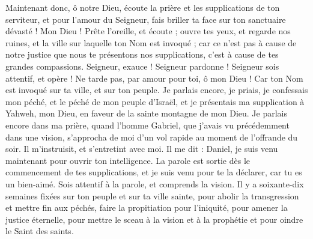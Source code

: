 \begin{multicols}{2}
Maintenant donc, ô notre Dieu, écoute la prière et les supplications de ton serviteur, et pour l'amour du Seigneur, fais briller ta face sur ton sanctuaire dévasté !
Mon Dieu ! Prête l'oreille, et écoute ; ouvre tes yeux, et regarde nos ruines, et la ville sur laquelle ton Nom est invoqué ; car ce n'est pas à cause de notre justice que nous te présentons nos supplications, c'est à cause de tes grandes compassions.
Seigneur, exauce ! Seigneur pardonne ! Seigneur sois attentif, et opère ! Ne tarde pas, par amour pour toi, ô mon Dieu ! Car ton Nom est invoqué sur ta ville, et sur ton peuple.
Je parlais encore, je priais, je confessais mon péché, et le péché de mon peuple d'Israël, et je présentais ma supplication à Yahweh, mon Dieu, en faveur de la sainte montagne de mon Dieu.
Je parlais encore dans ma prière, quand l'homme Gabriel, que j'avais vu précédemment dans une vision, s'approcha de moi d'un vol rapide au moment de l'offrande du soir.
Il m'instruisit, et s'entretint avec moi. Il me dit : Daniel, je suis venu maintenant pour ouvrir ton intelligence.
La parole est sortie dès le commencement de tes supplications, et je suis venu pour te la déclarer, car tu es un bien-aimé. Sois attentif à la parole, et comprends la vision.
Il y a soixante-dix semaines fixées sur ton peuple et sur ta ville sainte, pour abolir la transgression et mettre fin aux péchés, faire la propitiation pour l'iniquité, pour amener la justice éternelle, pour mettre le sceau à la vision et à la prophétie et pour oindre le Saint des saints.

\end{multicols}
